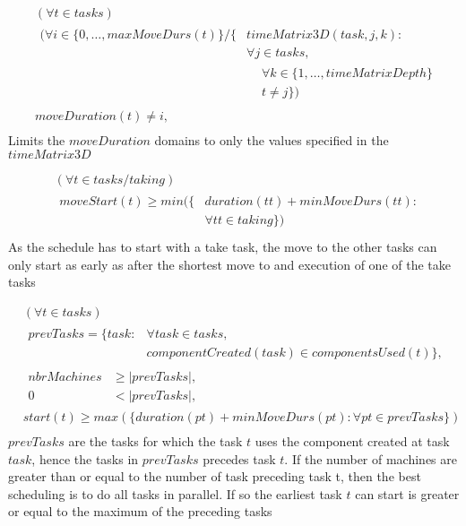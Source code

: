  \begin{equation}
 \begin{aligned}\label{eq:67}
 &(\forall t \in tasks)\\
 &\begin{aligned}
 (\forall i \in \{0 , \ldots , maxMoveDurs(t)\} / \{&timeMatrix3D(task,j,k) :\\
 &\forall j \in tasks,\\
 &\begin{aligned}
 &\forall k \in \{1 , \ldots , timeMatrixDepth\}\\
 &t \neq j\})
 \end{aligned}
 \end{aligned}\\
 &moveDuration(t) \neq i, \\
 \end{aligned}
 \end{equation}
 Limits the $moveDuration$ domains to only the values specified in the $timeMatrix3D$
 
 \begin{equation}
 \begin{aligned}\label{eq:69}
 &(\forall t \in tasks / taking) \\
 &\begin{aligned}
 moveStart(t) \ge min(\{&duration(tt) + minMoveDurs(tt) :\\
 &\forall tt \in taking\})\\
 \end{aligned}
 \end{aligned}
 \end{equation}
 As the schedule has to start with a take task, the move to the other tasks can only start as early as after the shortest move to and execution of one of the take tasks
 
 \begin{equation}
 \begin{aligned}\label{eq:70}
 &(\forall t \in tasks)\\
 &\begin{aligned}
 prevTasks = \{task : &\forall task \in tasks,\\
 &componentCreated(task) \in componentsUsed(t)\},
 \end{aligned}\\
 &\begin{aligned}
 nbrMachines &\ge |prevTasks|,\\
 0 &< |prevTasks|,
 \end{aligned}\\
 &start(t) \ge max(\{duration(pt) + minMoveDurs(pt) : \forall pt \in prevTasks\}) \\
 \end{aligned}
 \end{equation}
 $prevTasks$ are the tasks for which the task $t$ uses the component created at task $task$, hence the tasks in $prevTasks$ precedes task $t$. If the number of machines are greater than or equal to the number of task preceding task t, then the best scheduling is to do all tasks in parallel. If so the earliest task $t$ can start is greater or equal to the maximum of the preceding tasks
 
